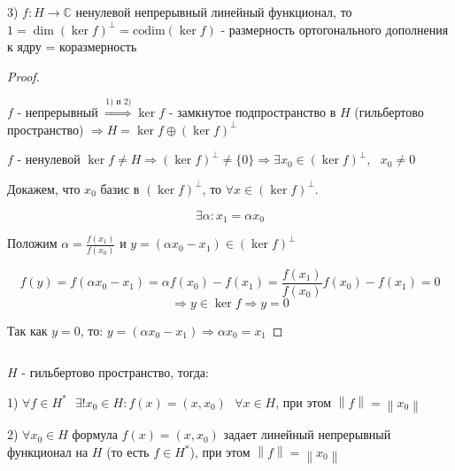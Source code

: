 \documentclass[12pt, a4paper]{report}
\begin{document}
3) \( f: H \to \mathbb{C}  \) ненулевой непрерывный линейный функционал, то \( 1=\dim (\ker f )^{ \perp } = \mathrm{codim } (\ker f)    \) - размерность ортогонального дополнения к ядру = коразмерность

\begin{proof} \(  \) 

    \( f  \) - непрерывный \( \overset{1) \text{ и } 2) }{\Rightarrow} \ker f  \) - замкнутое подпространство в \( H \) (гильбертово пространство)  \( \Rightarrow H = \ker f \oplus (\ker f)^{\perp }  \) 

    \( f \) - ненулевой \( \ker  f\neq H \Rightarrow (\ker f )^{\perp } \neq  \{0 \} \Rightarrow \exists  x_0 \in  (\ker f )^{ \perp } , \text{ }  x_0 \neq 0   \) 

    Докажем, что \( x_0 \) базис в \( (\ker  f)^{\perp }  \), то \( \forall  x \in  (\ker  f )^{\perp }  \). 

    \[ \exists \alpha : x_1 = \alpha x_0  \] 

    Положим \( \alpha = \displaystyle  \frac{ f(x_1 )}{ f(x_0 )}   \) и \( y = (\alpha x_0 - x_1 ) \in  (\ker f)^{\perp }  \) 

    \[ f(y )  = f(\alpha x_0 - x_1  ) = \alpha f(x_0 ) - f(x_1 ) = \frac{f(x_1 )}{f(x_0 )} f(x_0 ) -f(x_1) = 0  \] 
    \[ \Rightarrow y \in  \ker f \Rightarrow y = 0  \] 

    Так как \( y = 0  \), то: \( y = (\alpha x_0 - x_1 ) \Rightarrow \alpha x_0 = x_1 \) 

\end{proof}

\begin{theorem} \(  \) 

    \( H \) - гильбертово пространство, тогда: 

    1) \( \forall  f \in  H^* \text{ }  \exists  ! x_0 \in  H : f(x ) = (x, x_0 )  \text{ }  \forall  x \in  H\), при этом \( \left\lVert f  \right\rVert = \left\lVert x_0  \right\rVert \) 

    2) \( \forall  x_0 \in  H  \) формула \( f(x ) = (x, x_0)\) задает линейный непрерывный функционал на \( H \) (то есть \( f \in H^* \)), при этом \( \left\lVert f \right\rVert = \left\lVert x_0 \right\rVert \) 
\end{theorem}
\end{document}

